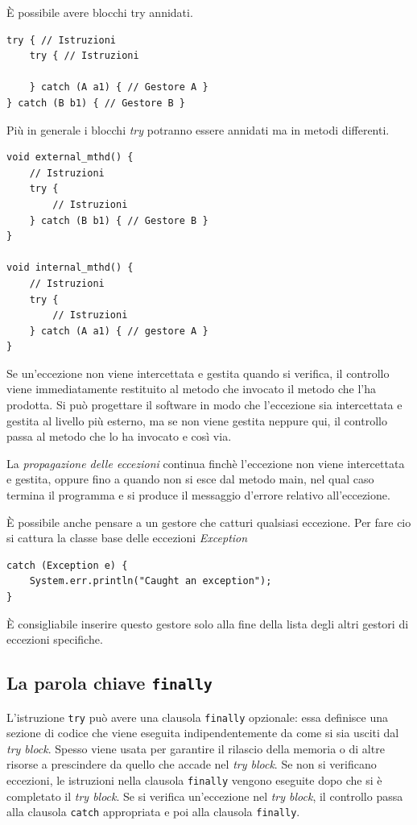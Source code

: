 \documentclass[12pt]{report}
\begin{document}
È possibile avere blocchi try annidati.
\begin{lstlisting}[style=javastyle]
try { // Istruzioni
	try { // Istruzioni

	} catch (A a1) { // Gestore A }
} catch (B b1) { // Gestore B }
\end{lstlisting}
Più in generale i blocchi \textit{try} potranno essere annidati ma in metodi differenti.
\begin{lstlisting}[style=javastyle]
void external_mthd() {
	// Istruzioni
	try {
		// Istruzioni
	} catch (B b1) { // Gestore B }
}

void internal_mthd() {
	// Istruzioni
	try {
		// Istruzioni
	} catch (A a1) { // gestore A }
}
\end{lstlisting}
Se un'eccezione non viene intercettata e gestita quando si verifica, il controllo viene immediatamente restituito al metodo che invocato il metodo che l'ha prodotta. Si può progettare il software in modo che l'eccezione sia intercettata e gestita al livello più esterno, ma se non viene gestita neppure qui, il controllo passa al metodo che lo ha invocato e così via.

La \textit{propagazione delle eccezioni} continua finchè l'eccezione non viene intercettata e gestita, oppure fino a quando non si esce dal metodo main, nel qual caso termina il programma e si produce il messaggio d'errore relativo all'eccezione.

È possibile anche pensare a un gestore che catturi qualsiasi eccezione. Per fare cio si cattura la classe base delle eccezioni \textit{Exception}
\begin{lstlisting}[style=javastyle]
catch (Exception e) {
	System.err.println("Caught an exception");
}
\end{lstlisting}
È consigliabile inserire questo gestore solo alla fine della lista degli altri gestori di eccezioni specifiche.
\subsection{La parola chiave \texttt{finally}}
L'istruzione \texttt{try} può avere una clausola \texttt{finally} opzionale: essa definisce una sezione di codice che viene eseguita indipendentemente da come si sia usciti dal \textit{try block}. Spesso viene usata per garantire il rilascio della memoria o di altre risorse a prescindere da quello che accade nel \textit{try block}. Se non si verificano eccezioni, le istruzioni nella clausola \texttt{finally} vengono eseguite dopo che si è completato il \textit{try block}. Se si verifica un'eccezione nel \textit{try block}, il controllo passa alla clausola \texttt{catch} appropriata e poi alla clausola \texttt{finally}.
\end{document}
